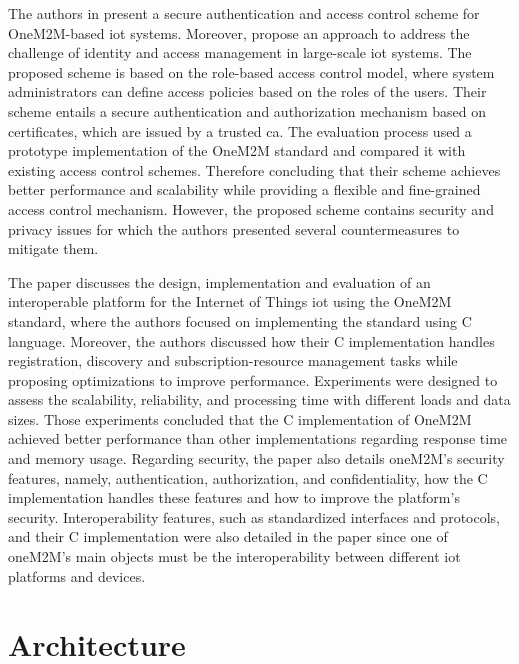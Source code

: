 \documentclass[a4paper,fleqn]{cas-dc}
\begin{document}
The authors in \cite{Benoygopal2021} present a secure authentication and access control scheme for OneM2M-based \gls{iot} systems. Moreover, propose an approach to address the challenge of identity and access management in large-scale \gls{iot} systems. The proposed scheme is based on the role-based access control model, where system administrators can define access policies based on the roles of the users. Their scheme entails a secure authentication and authorization mechanism based on certificates, which are issued by a trusted \gls{ca}. The evaluation process used a prototype implementation of the OneM2M standard and compared it with existing access control schemes. Therefore concluding that their scheme achieves better performance and scalability while providing a flexible and fine-grained access control mechanism. However, the proposed scheme contains security and privacy issues for which the authors presented several countermeasures to mitigate them.

The paper \cite{Kim2018} discusses the design, implementation and evaluation of an interoperable platform for the Internet of Things \gls{iot} using the OneM2M standard, where the authors focused on implementing the standard using C language. Moreover, the authors discussed how their C implementation handles registration, discovery and subscription-resource management tasks while proposing optimizations to improve performance. Experiments were designed to assess the scalability, reliability, and processing time with different loads and data sizes. Those experiments concluded that the C implementation of OneM2M achieved better performance than other implementations regarding response time and memory usage. Regarding security, the paper also details oneM2M's security features, namely, authentication, authorization, and confidentiality, how the C implementation handles these features and how to improve the platform's security. Interoperability features, such as standardized interfaces and protocols, and their C implementation were also detailed in the paper since one of oneM2M's main objects must be the interoperability between different \gls{iot} platforms and devices.


\section{Architecture}
\label{architecture}
\end{document}
